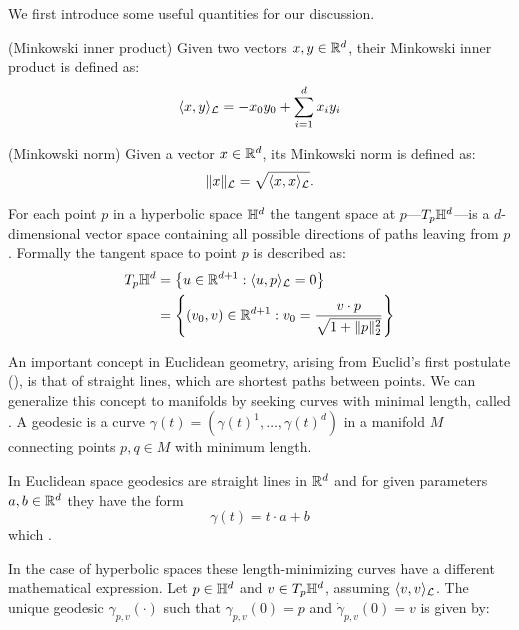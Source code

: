 

We first introduce some useful quantities for our discussion.

\begin{definition}(Minkowski inner product) \label{def:minkowskiInnerProduct}
    Given two vectors $x,y \in \mathbb{R}^d$, their Minkowski inner product is defined as:
    \begin{equation*}
        \langle x, y \rangle_{\mathcal{L}} = -x_0y_0+\sum_{i=1}^d x_iy_i
    \end{equation*}    
\end{definition}

\begin{definition}(Minkowski norm) \label{def:minkowskiNorm}
    Given a vector $x \in \mathbb{R}^d$, its Minkowski norm is defined as:
    \begin{equation*}
        \|x\|_{\mathcal{L}} = \sqrt{\langle x, x \rangle_{\mathcal{L}}}.
    \end{equation*}
\end{definition}

For each point $p$ in a hyperbolic space $\mathbb{H}^d$ the tangent space at $p$---$T_p\mathbb{H}^d$---is a $d$-dimensional vector space containing all possible directions of paths leaving from $p$. Formally the tangent space to point $p$ is described as:
\begin{align*}
    T_p\mathbb{H}^d 
    &= \left\{u\in \mathbb{R}^{d+1} : \langle u, p \rangle_{\mathcal{L}} = 0\right\} \\
    &= \left\{(v_0,v) \in \mathbb{R}^{d+1} : v_0 = \frac{v \cdot p}{\sqrt{1 + \|p\|^2_2}}\right\}
\end{align*}

An important concept in Euclidean geometry, arising from Euclid's first postulate (), is that of straight lines, which are shortest paths between points. We can generalize this concept to manifolds by seeking curves with minimal length, called . A geodesic is a curve $\gamma(t)=(\gamma(t)^1, \dots, \gamma(t)^d)$ in a manifold $M$ connecting points $p,q\in M$ with minimum length. 

In Euclidean space geodesics are straight lines in $\mathbb{R}^d$ and for given parameters $a,b\in \mathbb{R}^d$ they have the form 
\begin{equation}
    \gamma(t) = t\cdot a + b
\end{equation}
which . 

In the case of hyperbolic spaces these length-minimizing curves have a different mathematical expression. Let $p\in\mathbb{H}^d$ and $v\in T_p\mathbb{H}^d$, assuming $\langle v,v\rangle_{\mathcal{L}} $. The unique geodesic $\gamma_{p,v}(\cdot)$ such that $\gamma_{p,v}(0)=p$ and $\dot{\gamma}_{p,v}(0)=v$ is given by:

